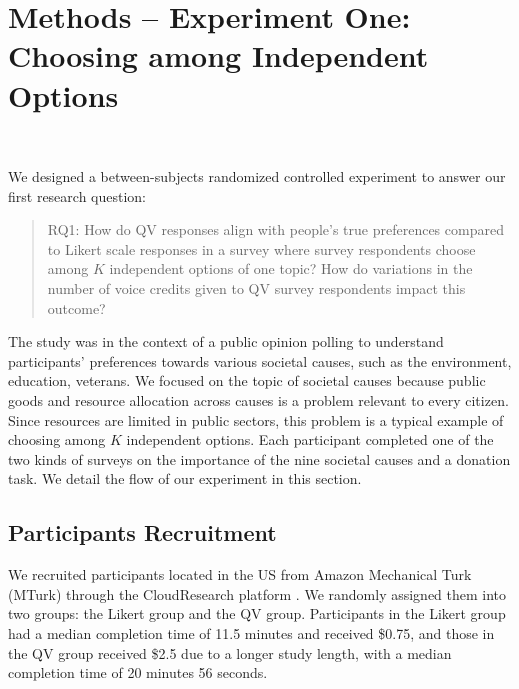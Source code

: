 \section{Methods -- Experiment One: Choosing among Independent Options}~\label{method_exp1}

We designed a between-subjects randomized controlled experiment to answer our first research question: \begin{quote} RQ1: How do QV responses align with people's true preferences compared to Likert scale responses in a survey where survey respondents choose among $K$ independent options of one topic? How do variations in the number of voice credits given to QV survey respondents impact this outcome? \end{quote} The study was in the context of a public opinion polling to understand participants' preferences towards various societal causes, such as the environment, education, veterans. We focused on the topic of societal causes because public goods and resource allocation across causes is a problem relevant to every citizen. Since resources are limited in public sectors, this problem is a typical example of choosing among $K$ independent options. Each participant completed one of the two kinds of surveys on the importance of the nine societal causes and a donation task. We detail the flow of our experiment in this section.

\subsection{Participants Recruitment}
We recruited participants located in the US from Amazon Mechanical Turk (MTurk) through the CloudResearch platform \cite{litman2017turkprime} .  We randomly assigned them into two groups: the Likert group and the QV group. Participants in the Likert group had a median completion time of 11.5 minutes and received \$0.75, and those in the QV group received \$2.5 due to a longer study length, with a median completion time of 20 minutes 56 seconds.

